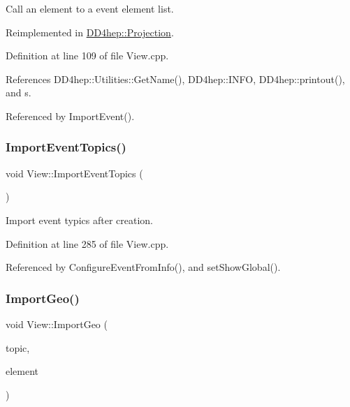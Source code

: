 Call an element to a event element list. 



Reimplemented in \hyperlink{class_d_d4hep_1_1_projection_a63d20236b4b67710dcfb9904848465aa}{D\+D4hep\+::\+Projection}.



Definition at line 109 of file View.\+cpp.



References D\+D4hep\+::\+Utilities\+::\+Get\+Name(), D\+D4hep\+::\+I\+N\+FO, D\+D4hep\+::printout(), and s.



Referenced by Import\+Event().

\hypertarget{class_d_d4hep_1_1_view_a825772febdb79469f13b40dd0acbe03c}{}\label{class_d_d4hep_1_1_view_a825772febdb79469f13b40dd0acbe03c} 
\subsubsection{\texorpdfstring{Import\+Event\+Topics()}{ImportEventTopics()}}
{\footnotesize\ttfamily void View\+::\+Import\+Event\+Topics (\begin{DoxyParamCaption}{ }\end{DoxyParamCaption})\hspace{0.3cm}{\ttfamily [virtual]}}



Import event typics after creation. 



Definition at line 285 of file View.\+cpp.



Referenced by Configure\+Event\+From\+Info(), and set\+Show\+Global().

\hypertarget{class_d_d4hep_1_1_view_acb0bf90adffd4235eaf2ecaa4c4e4bf5}{}\label{class_d_d4hep_1_1_view_acb0bf90adffd4235eaf2ecaa4c4e4bf5} 
\subsubsection{\texorpdfstring{Import\+Geo()}{ImportGeo()}\hspace{0.1cm}{\footnotesize\ttfamily [1/3]}}
{\footnotesize\ttfamily void View\+::\+Import\+Geo (\begin{DoxyParamCaption}\item[{const std\+::string \&}]{topic,  }\item[{T\+Eve\+Element $\ast$}]{element }\end{DoxyParamCaption})\hspace{0.3cm}{\ttfamily [virtual]}}



